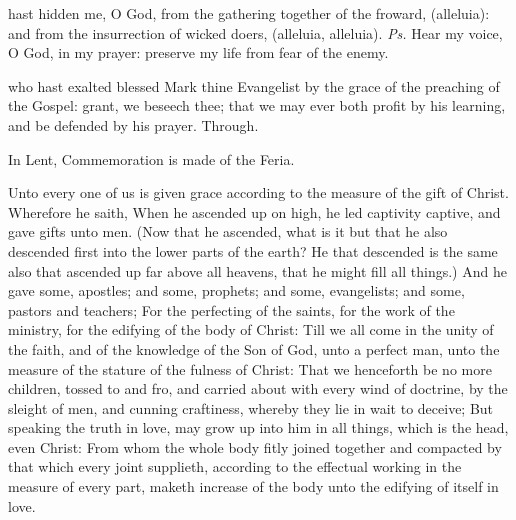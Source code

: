 
\introit
{} hast hidden me, O God, from the gathering together of the froward, (alleluia): and from the insurrection of wicked doers, (alleluia, alleluia). \textit{Ps.} Hear my voice, O God, in my prayer: preserve my life from fear of the enemy.

\collect
 who hast exalted blessed Mark thine Evangelist by the grace of the preaching of the Gospel: grant, we beseech thee; that we may ever both profit by his learning, and be defended by his prayer. Through.
\begin{rubric}
    In Lent, Commemoration is made of the Feria.%
\end{rubric}

 Unto every one of us is given grace according to the measure of the gift of Christ. Wherefore he saith, When he ascended up on high, he led captivity captive, and gave gifts unto men. (Now that he ascended, what is it but that he also descended first into the lower parts of the earth? He that descended is the same also that ascended up far above all heavens, that he might fill all things.) And he gave some, apostles; and some, prophets; and some, evangelists; and some, pastors and teachers; For the perfecting of the saints, for the work of the ministry, for the edifying of the body of Christ: Till we all come in the unity of the faith, and of the knowledge of the Son of God, unto a perfect man, unto the measure of the stature of the fulness of Christ: That we henceforth be no more children, tossed to and fro, and carried about with every wind of doctrine, by the sleight of men, and cunning craftiness, whereby they lie in wait to deceive; But speaking the truth in love, may grow up into him in all things, which is the head, even Christ: From whom the whole body fitly joined together and compacted by that which every joint supplieth, according to the effectual working in the measure of every part, maketh increase of the body unto the edifying of itself in love.


